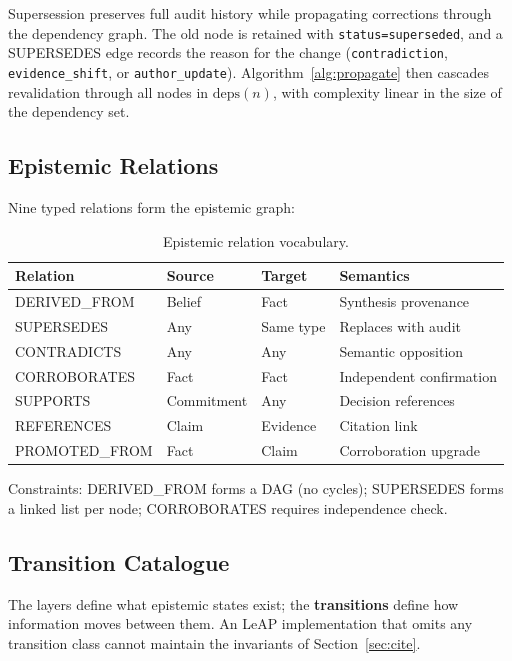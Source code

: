 \documentclass[11pt,letterpaper]{article}
\begin{document}
Supersession preserves full audit history while propagating corrections through the dependency graph. The old node is retained with \texttt{status=superseded}, and a SUPERSEDES edge records the reason for the change (\texttt{contradiction}, \texttt{evidence\_shift}, or \texttt{author\_update}). Algorithm~\ref{alg:propagate} then cascades revalidation through all nodes in $\text{deps}(n)$, with complexity linear in the size of the dependency set.

\subsection{Epistemic Relations}

Nine typed relations form the epistemic graph:

\begin{table}[H]
\centering
\caption{Epistemic relation vocabulary.}
\label{tab:relations}
\begin{tabular}{@{}llll@{}}
\toprule
\textbf{Relation} & \textbf{Source} & \textbf{Target} & \textbf{Semantics} \\
\midrule
DERIVED\_FROM & Belief & Fact & Synthesis provenance \\
SUPERSEDES & Any & Same type & Replaces with audit \\
CONTRADICTS & Any & Any & Semantic opposition \\
CORROBORATES & Fact & Fact & Independent confirmation \\
SUPPORTS & Commitment & Any & Decision references \\
REFERENCES & Claim & Evidence & Citation link \\
PROMOTED\_FROM & Fact & Claim & Corroboration upgrade \\
\bottomrule
\end{tabular}
\end{table}

Constraints: DERIVED\_FROM forms a DAG (no cycles); SUPERSEDES forms a linked list per node; CORROBORATES requires independence check.

\subsection{Transition Catalogue}

The layers define what epistemic states exist; the \textbf{transitions} define how information moves between them. An LeAP implementation that omits any transition class cannot maintain the invariants of Section~\ref{sec:cite}.
\end{document}
